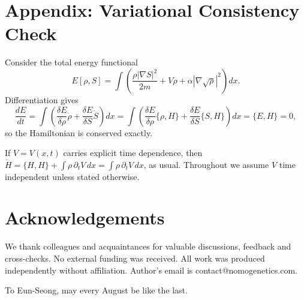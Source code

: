 \documentclass[11pt,a4paper]{article}
\numberwithin{equation}{section}
\theoremstyle{thmcompact}
\theoremstyle{remark}
\begin{document}
	
	\section{Appendix: Variational Consistency Check}
	\label{app:variational}
	Consider the total energy functional
	\[
	E[\rho,S]=\int\!\!\left(\frac{\rho|\nabla S|^2}{2m}+V\rho+\alpha|\nabla\sqrt\rho|^2\right)dx.
	\]
	Differentiation gives
	\[
	\frac{dE}{dt}
	=\int\left(\frac{\delta E}{\delta\rho}\dot\rho+\frac{\delta E}{\delta S}\dot S\right)dx
	=\int\left(\frac{\delta E}{\delta\rho}\{\rho,H\}+\frac{\delta E}{\delta S}\{S,H\}\right)dx
	=\{E,H\}=0,
	\]
	so the Hamiltonian is conserved exactly.
	
	If $V=V(x,t)$ carries explicit time dependence, then $\dot H=\{H,H\}+\int \rho\,\partial_t V\,dx=\int \rho\,\partial_t V\,dx$, as usual. Throughout we assume $V$ time independent unless stated otherwise.
	
	\newpage
	
	\section*{Acknowledgements}
	
We thank colleagues and acquaintances for valuable discussions, feedback and cross-checks.
 No external funding was received. All work was produced independently without affiliation. Author's email is contact@nomogenetics.com.
	
To Eun-Seong, may every August be like the last.
\end{document}
